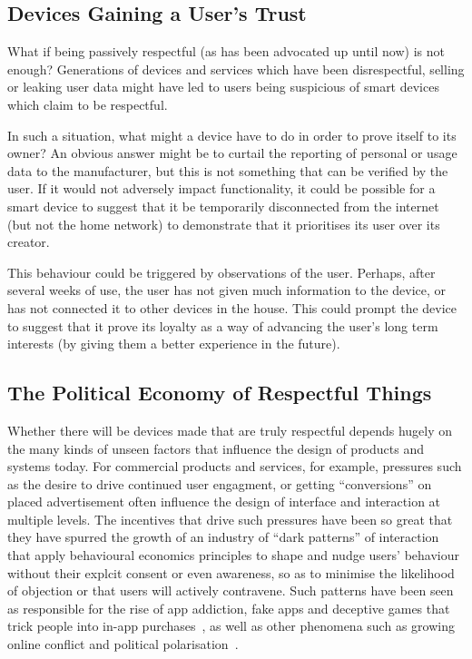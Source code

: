 \documentclass{IETpaper}
\begin{document}
\subsection{Devices Gaining a User's Trust}
What if being passively respectful (as has been advocated up until now) is not enough? Generations of devices and services which have been disrespectful, selling or leaking user data might have led to users being suspicious of smart devices which claim to be respectful.

In such a situation, what might a device have to do in order to prove itself to its owner? An obvious answer might be to curtail the reporting of personal or usage data to the manufacturer, but this is not something that can be verified by the user. If it would not adversely impact functionality, it could be possible for a smart device to suggest that it be temporarily disconnected from the internet (but not the home network) to demonstrate that it prioritises its user over its creator.

This behaviour could be triggered by observations of the user. Perhaps, after several weeks of use, the user has not given much information to the device, or has not connected it to other devices in the house. This could prompt the device to suggest that it prove its loyalty as a way of advancing the user's long term interests (by giving them a better experience in the future).




\subsection{The Political Economy of Respectful Things}

Whether there will be devices made that are truly respectful depends hugely on the many kinds of unseen factors that influence the design of products and systems today.  For commercial products and services, for example, pressures such as the desire to drive continued user engagment, or getting ``conversions'' on placed advertisement often influence the design of interface and interaction at multiple levels.  The incentives that drive such pressures have been so great that they have spurred the growth of an industry of  ``dark patterns'' of interaction~\cite{zagal2013dark,greenberg2014dark} that   apply behavioural economics principles to shape and nudge users' behaviour without their explcit consent or even awareness, so as to minimise the likelihood of objection or that users will actively contravene.   Such patterns have been seen as responsible for the rise of app addiction, fake apps and deceptive games that trick people into in-app purchases~\cite{soroush2014self}, as well as other phenomena such as growing online conflict and political polarisation~\cite{marichal2016facebook}.
\end{document}
